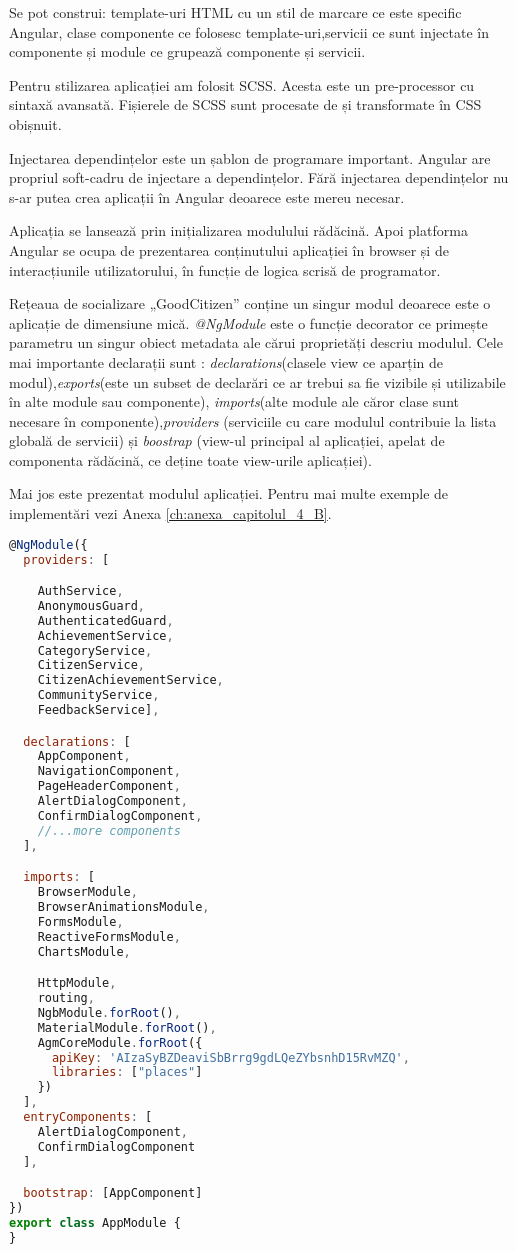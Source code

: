 	Se pot construi: template-uri HTML cu un stil de marcare ce este specific Angular,
clase componente ce folosesc template-uri,servicii ce sunt injectate în componente și 
module ce grupează componente și servicii.

	Pentru stilizarea aplicației am folosit SCSS.
Acesta este un pre-processor cu sintaxă avansată. Fișierele de SCSS sunt procesate de și transformate în CSS obișnuit.

	Injectarea dependințelor este un șablon de programare important. Angular are propriul soft-cadru de injectare
a dependințelor. Fără injectarea dependințelor nu s-ar putea crea aplicații în Angular deoarece este mereu necesar.

	Aplicația se lansează prin inițializarea modulului rădăcină. Apoi platforma Angular
se ocupa de prezentarea conținutului aplicației în browser și de interacțiunile utilizatorului,
în funcție de logica scrisă de programator.

	Rețeaua de socializare „GoodCitizen” conține un singur modul deoarece este o aplicație de
dimensiune mică. \textit{@NgModule} este o funcție decorator ce primește parametru un singur 
obiect metadata ale cărui proprietăți descriu modulul. Cele mai importante declarații sunt :
\textit{declarations}(clasele view ce aparțin de modul),\textit{exports}(este un subset de 
declarări ce ar trebui sa fie vizibile și utilizabile în alte module sau componente),
\textit{imports}(alte module ale căror clase sunt necesare în componente),\textit{providers}
(serviciile cu care modulul contribuie la lista globală de servicii) și \textit{boostrap}
(view-ul principal al aplicației, apelat de componenta rădăcină, ce deține toate view-urile 
aplicației).  

Mai jos este prezentat modulul aplicației. Pentru mai multe exemple de implementări vezi Anexa \ref{ch:anexa_capitolul_4_B}.
\begin {lstlisting}[language=JavaScript]
	@NgModule({
  providers: [

    AuthService,
    AnonymousGuard,
    AuthenticatedGuard,
    AchievementService,
    CategoryService,
    CitizenService,
    CitizenAchievementService,
    CommunityService,
    FeedbackService],

  declarations: [
    AppComponent,
    NavigationComponent,
    PageHeaderComponent,
    AlertDialogComponent,
    ConfirmDialogComponent,
	//...more components
  ],

  imports: [
    BrowserModule,
    BrowserAnimationsModule,
    FormsModule,
    ReactiveFormsModule,
    ChartsModule,

    HttpModule,
    routing,
    NgbModule.forRoot(),
    MaterialModule.forRoot(),
    AgmCoreModule.forRoot({
      apiKey: 'AIzaSyBZDeaviSbBrrg9gdLQeZYbsnhD15RvMZQ',
      libraries: ["places"]
    })
  ],
  entryComponents: [
    AlertDialogComponent,
    ConfirmDialogComponent
  ],

  bootstrap: [AppComponent]
})
export class AppModule {
}
\end{lstlisting}

